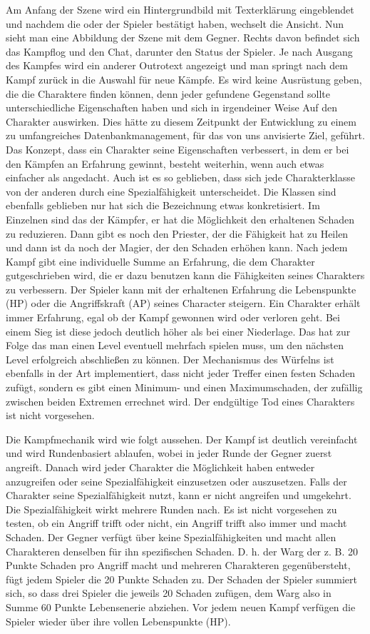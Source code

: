 Am Anfang der Szene wird ein Hintergrundbild mit Texterklärung eingeblendet und nachdem die oder der Spieler bestätigt haben, wechselt die Ansicht. Nun sieht man eine Abbildung der Szene mit dem Gegner. Rechts davon befindet sich das Kampflog und den Chat, darunter den Status der Spieler. Je nach Ausgang des Kampfes wird ein anderer Outrotext angezeigt und man springt nach dem Kampf zurück in die Auswahl für neue Kämpfe. Es wird keine Ausrüstung geben, die die Charaktere finden können, denn jeder gefundene Gegenstand sollte unterschiedliche Eigenschaften haben und sich in irgendeiner Weise Auf den Charakter auswirken. Dies hätte zu diesem Zeitpunkt der Entwicklung zu einem zu umfangreiches Datenbankmanagement, für das von uns anvisierte Ziel, geführt. Das Konzept, dass ein Charakter seine Eigenschaften verbessert, in dem er bei den Kämpfen an Erfahrung gewinnt, besteht weiterhin, wenn auch etwas einfacher als angedacht. Auch ist es so geblieben, dass sich jede Charakterklasse von der anderen durch eine Spezialfähigkeit unterscheidet. Die Klassen sind ebenfalls geblieben nur hat sich die Bezeichnung etwas konkretisiert. Im Einzelnen sind das der Kämpfer, er hat die Möglichkeit den erhaltenen Schaden zu reduzieren. Dann gibt es noch den Priester, der die Fähigkeit hat zu Heilen und dann ist da noch der Magier, der den Schaden erhöhen kann. Nach jedem Kampf gibt eine individuelle Summe an Erfahrung, die dem Charakter gutgeschrieben wird, die er dazu benutzen kann die Fähigkeiten seines Charakters zu verbessern. Der Spieler kann mit der erhaltenen Erfahrung die Lebenspunkte (HP) oder die Angriffskraft (AP) seines Character steigern. Ein Charakter erhält immer Erfahrung, egal ob der Kampf gewonnen wird oder verloren geht. Bei einem Sieg ist diese jedoch deutlich höher als bei einer Niederlage. Das hat zur Folge das man einen Level eventuell mehrfach spielen muss, um den nächsten Level erfolgreich abschließen zu können. Der Mechanismus des Würfelns ist ebenfalls in der Art implementiert, dass nicht jeder Treffer einen festen Schaden zufügt, sondern es gibt einen Minimum- und einen Maximumschaden, der zufällig zwischen beiden Extremen errechnet wird. Der endgültige Tod eines Charakters ist nicht vorgesehen. 

Die Kampfmechanik wird wie folgt aussehen. Der Kampf ist deutlich vereinfacht und wird Rundenbasiert ablaufen, wobei in jeder Runde der Gegner zuerst angreift. Danach wird jeder Charakter die Möglichkeit haben entweder anzugreifen oder seine Spezialfähigkeit einzusetzen oder auszusetzen. Falls der Charakter seine Spezialfähigkeit nutzt, kann er nicht angreifen und umgekehrt. Die Spezialfähigkeit wirkt mehrere Runden nach. Es ist nicht vorgesehen zu testen, ob ein Angriff trifft oder nicht, ein Angriff trifft also immer und macht Schaden. Der Gegner verfügt über keine Spezialfähigkeiten und macht allen Charakteren denselben für ihn spezifischen Schaden. D. h. der Warg der z. B. 20 Punkte Schaden pro Angriff macht und mehreren Charakteren gegenübersteht, fügt jedem Spieler die 20 Punkte Schaden zu. Der Schaden der Spieler summiert sich, so dass drei Spieler die jeweils 20 Schaden zufügen, dem Warg also in Summe 60 Punkte Lebensenerie abziehen. Vor jedem neuen Kampf verfügen die Spieler wieder über ihre vollen Lebenspunkte (HP).

